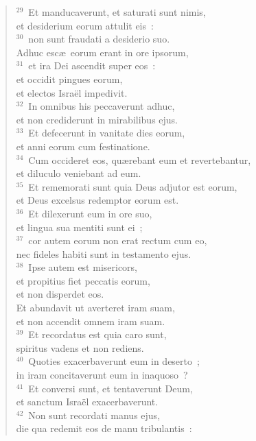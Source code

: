 \begin{verse}
${}^{29}$~Et manducaverunt, et saturati sunt nimis,\\ et desiderium eorum attulit eis~:\\
${}^{30}$~non sunt fraudati a desiderio suo.\\ Adhuc esc\ae\ eorum erant in ore ipsorum,\\
${}^{31}$~et ira Dei ascendit super eos~:\\ et occidit pingues eorum,\\ et electos Isra\"el impedivit.\\
${}^{32}$~In omnibus his peccaverunt adhuc,\\ et non crediderunt in mirabilibus ejus.\\
${}^{33}$~Et defecerunt in vanitate dies eorum,\\ et anni eorum cum festinatione.\\
${}^{34}$~Cum occideret eos, qu\ae rebant eum et revertebantur,\\ et diluculo veniebant ad eum.\\
${}^{35}$~Et rememorati sunt quia Deus adjutor est eorum,\\ et Deus excelsus redemptor eorum est.\\
${}^{36}$~Et dilexerunt eum in ore suo,\\ et lingua sua mentiti sunt ei~;\\
${}^{37}$~cor autem eorum non erat rectum cum eo,\\ nec fideles habiti sunt in testamento ejus.\\
${}^{38}$~Ipse autem est misericors,\\ et propitius fiet peccatis eorum,\\ et non disperdet eos.\\ Et abundavit ut averteret iram suam,\\ et non accendit omnem iram suam.\\
${}^{39}$~Et recordatus est quia caro sunt,\\ spiritus vadens et non rediens.\\
${}^{40}$~Quoties exacerbaverunt eum in deserto~;\\ in iram concitaverunt eum in inaquoso~?\\
${}^{41}$~Et conversi sunt, et tentaverunt Deum,\\ et sanctum Isra\"el exacerbaverunt.\\
${}^{42}$~Non sunt recordati manus ejus,\\ die qua redemit eos de manu tribulantis~:\\

\end{verse}
